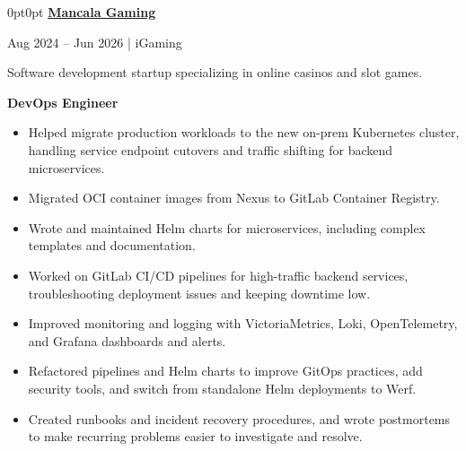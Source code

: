 \documentclass[12pt,letterpaper]{article}
\newenvironment{highlights}{%
  \begin{itemize}[
    topsep=.12cm,
    parsep=.08cm,
    itemsep=0pt,
    leftmargin=10pt
  ]}{%
  \end{itemize}}
\newenvironment{block}{%
  \begin{adjustwidth}{0pt}{0pt}}{%
  \end{adjustwidth}}
\newlength{\companydatesep}
\newlength{\datedescriptionsep}
\newlength{\descriptionrolesep}
\newcommand{\experienceheader}[5]{%
  \needspace{7\baselineskip}%
  \textbf{\href{#2}{#1 \faAlt{link}}}\par
  \vspace{\companydatesep}%
  #3\par
  \vspace{\datedescriptionsep}%
  #4\par
  \vspace{\descriptionrolesep}%
  \textbf{#5}\par
}
\newcommand{\tripledotsline}{%
  \par\vspace{0.16cm}%
  \noindent\makebox[\linewidth][c]{%
    \ldots
  }%
  \par\vspace{0.16cm}%
}
\begin{document}
\begin{block}
  \experienceheader
    {Mancala Gaming}
    {https://mancalagaming.com/}
    {Aug 2024 -- Jun 2026 | iGaming}
    {Software development startup specializing in online casinos
     and slot games.}
    {DevOps Engineer}

  \begin{highlights}
    \item Helped migrate production workloads to the new on-prem
    Kubernetes cluster, handling service endpoint cutovers and traffic
    shifting for backend microservices.

    \item Migrated OCI container images from Nexus to GitLab Container Registry.

    \item Wrote and maintained Helm charts for microservices,
    including complex templates and documentation.

    \item Worked on GitLab CI/CD pipelines for high-traffic
    backend services, troubleshooting deployment issues
    and keeping downtime low.

    \item Improved monitoring and logging with VictoriaMetrics,
    Loki, OpenTelemetry, and Grafana dashboards and alerts.

    \item Refactored pipelines and Helm charts to 
    improve GitOps practices, add security tools, 
    and switch from standalone Helm deployments to Werf.

    \item Created runbooks and incident recovery procedures,
    and wrote postmortems to make recurring problems easier
    to investigate and resolve.
  \end{highlights}
\end{block}

\tripledotsline
\newpage
\tripledotsline
  
\end{document}

